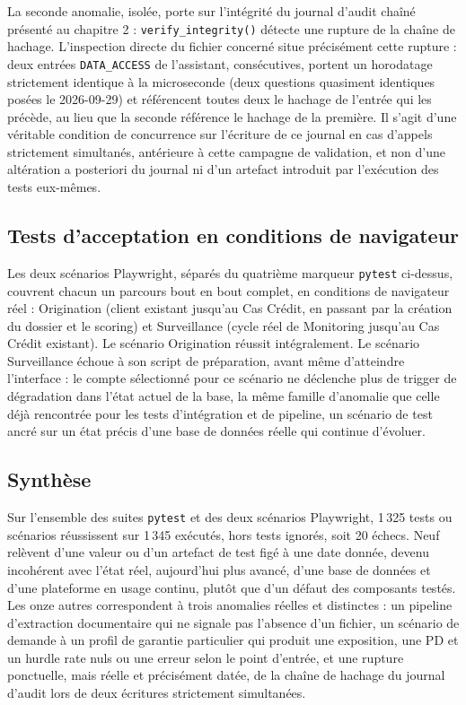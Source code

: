 La seconde anomalie, isolée, porte sur l'intégrité du journal d'audit chaîné présenté au chapitre 2 : \texttt{verify\_integrity()} détecte une rupture de la chaîne de hachage. L'inspection directe du fichier concerné situe précisément cette rupture : deux entrées \texttt{DATA\_ACCESS} de l'assistant, consécutives, portent un horodatage strictement identique à la microseconde (deux questions quasiment identiques posées le 2026-09-29) et référencent toutes deux le hachage de l'entrée qui les précède, au lieu que la seconde référence le hachage de la première. Il s'agit d'une véritable condition de concurrence sur l'écriture de ce journal en cas d'appels strictement simultanés, antérieure à cette campagne de validation, et non d'une altération a posteriori du journal ni d'un artefact introduit par l'exécution des tests eux-mêmes.

\subsection{Tests d'acceptation en conditions de navigateur}

Les deux scénarios Playwright, séparés du quatrième marqueur \texttt{pytest} ci-dessus, couvrent chacun un parcours bout en bout complet, en conditions de navigateur réel : Origination (client existant jusqu'au Cas Crédit, en passant par la création du dossier et le scoring) et Surveillance (cycle réel de Monitoring jusqu'au Cas Crédit existant). Le scénario Origination réussit intégralement. Le scénario Surveillance échoue à son script de préparation, avant même d'atteindre l'interface : le compte sélectionné pour ce scénario ne déclenche plus de trigger de dégradation dans l'état actuel de la base, la même famille d'anomalie que celle déjà rencontrée pour les tests d'intégration et de pipeline, un scénario de test ancré sur un état précis d'une base de données réelle qui continue d'évoluer.

\subsection{Synthèse}

Sur l'ensemble des suites \texttt{pytest} et des deux scénarios Playwright, 1\,325 tests ou scénarios réussissent sur 1\,345 exécutés, hors tests ignorés, soit 20 échecs. Neuf relèvent d'une valeur ou d'un artefact de test figé à une date donnée, devenu incohérent avec l'état réel, aujourd'hui plus avancé, d'une base de données et d'une plateforme en usage continu, plutôt que d'un défaut des composants testés. Les onze autres correspondent à trois anomalies réelles et distinctes : un pipeline d'extraction documentaire qui ne signale pas l'absence d'un fichier, un scénario de demande à un profil de garantie particulier qui produit une exposition, une PD et un hurdle rate nuls ou une erreur selon le point d'entrée, et une rupture ponctuelle, mais réelle et précisément datée, de la chaîne de hachage du journal d'audit lors de deux écritures strictement simultanées.

